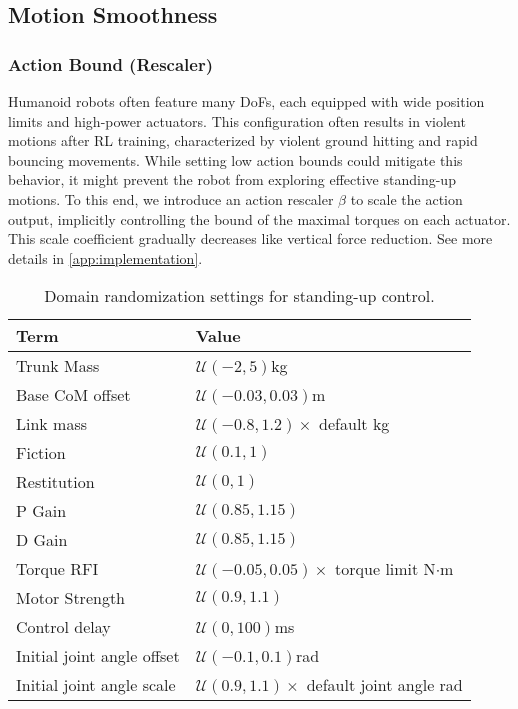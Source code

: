 \subsection{Motion Smoothness}\label{subsec:motion_smoothness}
\subsubsection{Action Bound (Rescaler)} Humanoid robots often feature many DoFs, each equipped with wide position limits and high-power actuators. This configuration often results in violent motions after RL training, characterized by violent ground hitting and rapid bouncing movements. While setting low action bounds could mitigate this behavior, it might prevent the robot from exploring effective standing-up motions. To this end, we introduce an action rescaler $\beta$ to scale the action output, implicitly controlling the bound of the maximal torques on each actuator. This scale coefficient gradually decreases like vertical force reduction. See more details in \cref{app:implementation}.

\begin{table}[t]
    \centering
    \caption{Domain randomization settings for standing-up control.}
    \begin{tabular}{ll}
    \toprule 
    Term & Value \\
    \midrule 
    Trunk Mass & $\mathcal{U}(-2,5)$kg  \\
    Base CoM offset & $\mathcal{U}(-0.03,0.03)$m \\
    Link mass & $\mathcal{U}(-0.8,1.2)\times$ default kg  \\ 
    Fiction & $\mathcal{U}(0.1,1)$ \\
    Restitution & $\mathcal{U}(0,1)$ \\
    P Gain & $\mathcal{U}(0.85,1.15)$ \\
    D Gain & $\mathcal{U}(0.85,1.15)$ \\
    Torque RFI~\cite{campanaro2024learning} & $\mathcal{U}(-0.05,0.05)\times$ torque limit N$\cdot$m  \\
    Motor Strength & $\mathcal{U}(0.9,1.1)$ \\
    Control delay & $\mathcal{U}(0, 100)$ms \\
    Initial joint angle offset & $\mathcal{U}(-0.1, 0.1)$rad \\
    Initial joint angle scale & $\mathcal{U}(0.9, 1.1)\times$ default joint angle rad \\
    \bottomrule
    \end{tabular}
    \label{table:domain_randomization}
\end{table}

